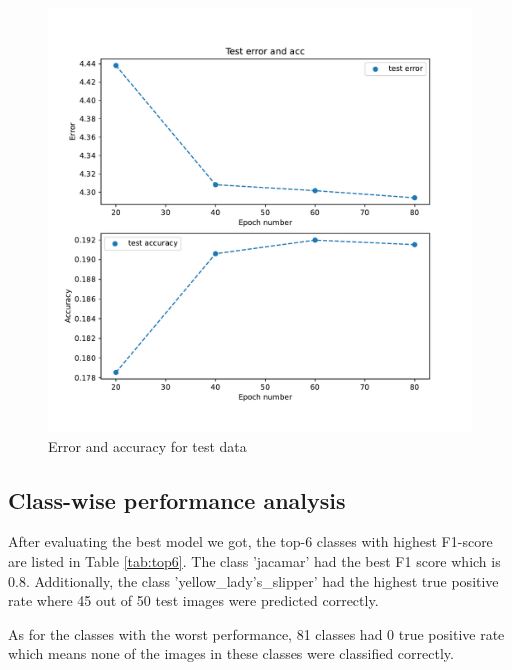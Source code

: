 \documentclass{article}
\begin{document}
\begin{figure}[H]
\centerline{\includegraphics[scale=0.4]{test.pdf}}
\caption{Error and accuracy for test data}
\label{test}
\begin{small}
\end{small}
\end{figure}

\subsection{Class-wise performance analysis}
After evaluating the best model we got, the top-6 classes with highest F1-score are listed in Table \ref{tab:top6}. The class 'jacamar' had the best F1 score which is 0.8. Additionally, the class 'yellow\_lady’s\_slipper' had the highest true positive rate where 45 out of 50 test images were predicted correctly.  

As for the classes with the worst performance, 81 classes had 0 true positive rate which means none of the images in these classes were classified correctly. 
\end{document}
